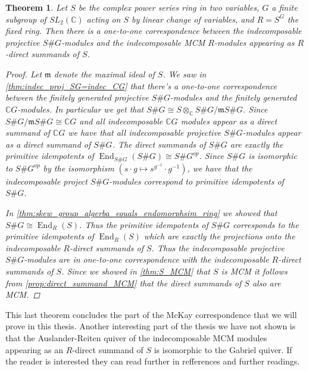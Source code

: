 \documentclass[11pt, a4paper, english]{article}
\newtheorem{theorem}{Theorem}[section]
\theoremstyle{definition}
\newcommand{\C}{\mathbb{C}}
\DeclareMathOperator{\End}{End}
\begin{document}
\begin{theorem}
Let $S$ be the complex power series ring in two variables, $G$ a finite subgroup of $SL_2(\C)$ acting on $S$ by linear change of variables, and $R=S^G$ the fixed ring. Then there is a one-to-one correspondence between the indecomposable projective $S\#G$-modules and the indecomposable MCM $R$-modules appearing as $R$-direct summands of $S$.

\begin{proof}
Let $\mathfrak{m}$ denote the maximal ideal of $S$. We saw in \cref{thm:indec_proj_SG=indec_CG} that there's a one-to-one correspondence between the finitely generated projective $S\#G$-modules and the finitely generated $\C G$-modules. In particular we get that $S\#G \cong S \otimes_\C S\#G/\mathfrak{m}S\#G$. Since $S\#G/\mathfrak{m}S\#G \cong \C G$ and all indecomposable $\C G$ modules appear as a direct summand of $\C G$ we have that all indecomposable projective $S\#G$-modules appear as a direct summand of $S\#G$. The direct summands of $S\#G$ are exactly the primitive idempotents of $\End_{S\#G}(S\#G) \cong S\#G^{op}$. Since $S\#G$ is isomorphic to $S\#G^{op}$ by the isomorphism $(s\cdot g \mapsto s^{g^{-1}} \cdot g^{-1})$, we have that the indecomposable project $S\#G$-modules correspond to primitive idempotents of $S\#G$.

In \cref{thm:skew_group_algerba_equals_endomorphsim_ring} we showed that $S\#G \cong \End_R(S)$. Thus the primitive idempotents of $S\#G$ corresponds to the primitive idempotents of $\End_R(S)$ which are exactly the projections onto the indecomposable $R$-direct summands of $S$. Thus the indecomposable projective $S\#G$-modules are in one-to-one correspondence with the indecomposable $R$-direct summands of $S$. Since we showed in \cref{thm:S_MCM} that $S$ is MCM it follows from \cref{prop:direct_summand_MCM} that the direct summands of $S$ also are MCM.
\end{proof}
\end{theorem}

This last theorem concludes the part of the McKay correspondence that we will prove in this thesis. Another interesting part of the thesis we have not shown is that the Auslander-Reiten quiver of the indecomposable MCM modules appearing as an $R$-direct summand of $S$ is isomorphic to the Gabriel quiver. If the reader is interested they can read further in {\color{red} refferences and further readings}.
\end{document}
